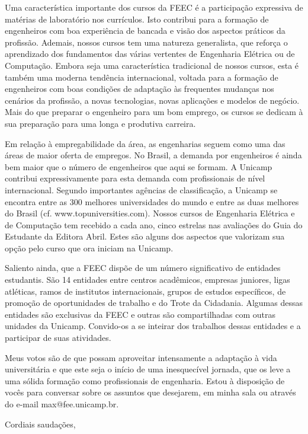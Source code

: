 \documentclass[a4paper,10pt, twocolumn]{article}
\begin{document}
Uma característica importante dos cursos da FEEC é a participação expressiva de
matérias de laboratório nos currículos. Isto contribui para a formação de
engenheiros com boa experiência de bancada e visão dos aspectos práticos da
profissão. Ademais, nossos cursos tem uma natureza generalista, que reforça
o aprendizado dos fundamentos das várias vertentes de Engenharia Elétrica ou de
Computação. Embora seja uma característica tradicional de nossos cursos, esta
é também uma moderna tendência internacional, voltada para a formação de
engenheiros com boas condições de adaptação às frequentes mudanças nos cenários
da profissão, a novas tecnologias, novas aplicações e modelos de negócio. Mais
do que preparar o engenheiro para um bom emprego, os cursos se dedicam à sua
preparação para uma longa e produtiva carreira.

Em relação à empregabilidade da área, as engenharias seguem como uma das áreas
de maior oferta de empregos. No Brasil, a demanda por engenheiros é ainda bem
maior que o número de engenheiros que aqui se formam. A Unicamp contribui
expressivamente para esta demanda com profissionais de nível internacional.
Segundo importantes agências de classificação, a Unicamp se encontra entre as
300 melhores universidades do mundo e entre as duas melhores do Brasil (cf.
www.topuniversities.com). Nossos cursos de Engenharia Elétrica e de Computação
tem recebido a cada ano, cinco estrelas nas avaliações do Guia do Estudante da
Editora Abril. Estes são alguns dos aspectos que valorizam sua opção pelo curso
que ora iniciam na Unicamp.

Saliento ainda, que a FEEC dispõe de um número significativo de entidades
estudantis. São 14 entidades entre centros acadêmicos, empresas juniores, ligas
atléticas, ramos de institutos internacionais, grupos de estudos específicos, de
promoção de oportunidades de trabalho e do Trote da Cidadania. Algumas dessas
entidades são exclusivas da FEEC e outras são compartilhadas com outras unidades
da Unicamp. Convido-os a se inteirar dos trabalhos dessas entidades
e a participar de suas atividades.

Meus votos são de que possam aproveitar intensamente a adaptação à vida
universitária e que este seja o início de uma inesquecível jornada, que os leve
a uma sólida formação como profissionais de engenharia. Estou à disposição de
vocês para conversar sobre os assuntos que desejarem, em minha sala ou através
do e-mail max@fee.unicamp.br.

Cordiais saudações,
\end{document}

